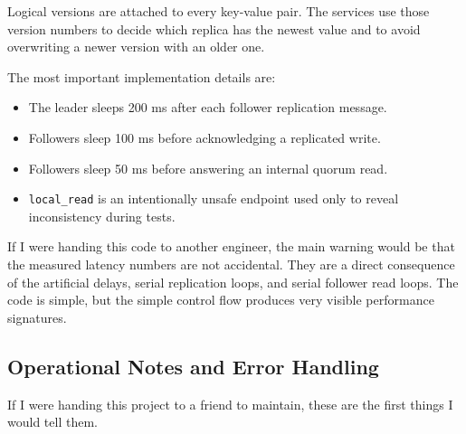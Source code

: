 \documentclass[11pt]{article}
\begin{document}
Logical versions are attached to every key-value pair. The services use those version numbers to decide which replica has the newest value and to avoid overwriting a newer version with an older one.

The most important implementation details are:
\begin{itemize}
\item The leader sleeps 200 ms after each follower replication message.
\item Followers sleep 100 ms before acknowledging a replicated write.
\item Followers sleep 50 ms before answering an internal quorum read.
\item \texttt{local\_read} is an intentionally unsafe endpoint used only to reveal inconsistency during tests.
\end{itemize}

If I were handing this code to another engineer, the main warning would be that the measured latency numbers are not accidental. They are a direct consequence of the artificial delays, serial replication loops, and serial follower read loops. The code is simple, but the simple control flow produces very visible performance signatures.

\subsection*{Operational Notes and Error Handling}

If I were handing this project to a friend to maintain, these are the first things I would tell them.
\end{document}
